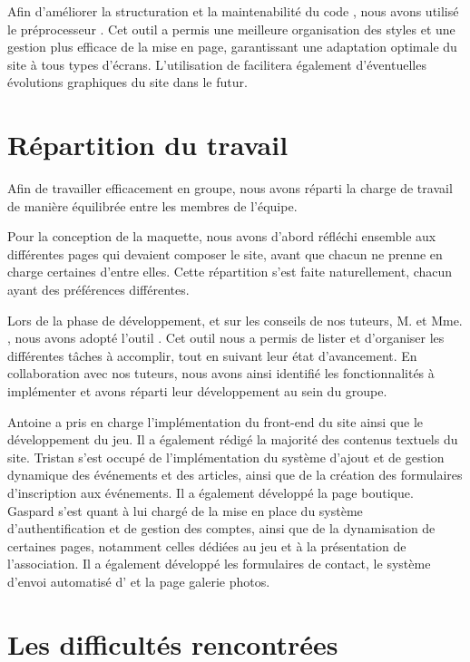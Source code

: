 Afin d’améliorer la structuration et la maintenabilité du code , nous avons utilisé le préprocesseur . Cet outil a permis une meilleure organisation des styles et une gestion plus efficace de la mise en page, garantissant une adaptation optimale du site à tous types d’écrans. L’utilisation de  facilitera également d’éventuelles évolutions graphiques du site dans le futur.

\section{Répartition du travail}
\label{sec:repartition-travail}

Afin de travailler efficacement en groupe, nous avons réparti la charge de travail de manière équilibrée entre les membres de l'équipe.

Pour la conception de la maquette, nous avons d'abord réfléchi ensemble aux différentes pages qui devaient composer le site, avant que chacun ne prenne en charge certaines d’entre elles. Cette répartition s’est faite naturellement, chacun ayant des préférences différentes.

Lors de la phase de développement, et sur les conseils de nos tuteurs, M.  et Mme. , nous avons adopté l’outil . Cet outil nous a permis de lister et d’organiser les différentes tâches à accomplir, tout en suivant leur état d'avancement. En collaboration avec nos tuteurs, nous avons ainsi identifié les fonctionnalités à implémenter et avons réparti leur développement au sein du groupe.

Antoine a pris en charge l’implémentation du front-end du site ainsi que le développement du jeu. Il a également rédigé la majorité des contenus textuels du site.
Tristan s’est occupé de l’implémentation du système d’ajout et de gestion dynamique des événements et des articles, ainsi que de la création des formulaires d’inscription aux événements. Il a également développé la page boutique.
Gaspard s’est quant à lui chargé de la mise en place du système d’authentification et de gestion des comptes, ainsi que de la dynamisation de certaines pages, notamment celles dédiées au jeu et à la présentation de l’association. Il a également développé les formulaires de contact, le système d’envoi automatisé d’ et la page galerie photos.

\section{Les difficultés rencontrées}
\label{sec:difficultes}

